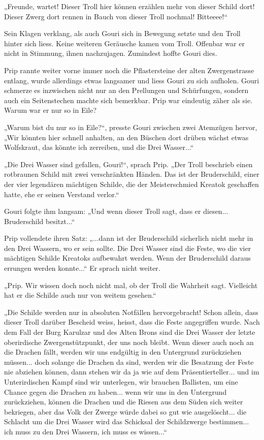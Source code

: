 „Freunde, wartet! Dieser Troll hier können erzählen mehr von dieser Schild dort! Dieser Zwerg dort rennen in Bauch von dieser Troll nochmal! Bitteeee!“

Sein Klagen verklang, als auch Gouri sich in Bewegung setzte und den Troll hinter sich liess. Keine weiteren Geräusche kamen vom Troll. Offenbar war er nicht in Stimmung, ihnen nachzujagen. Zumindest hoffte Gouri dies.

Prip rannte weiter vorne immer noch die Pflastersteine der alten Zwergenstrasse entlang, wurde allerdings etwas langsamer und liess Gouri zu sich aufholen. Gouri schmerze es inzwischen nicht nur an den Prellungen und Schürfungen, sondern auch ein Seitenstechen machte sich bemerkbar. Prip war eindeutig zäher als sie. Warum war er nur so in Eile?

„Warum bist du nur so in Eile?“, presste Gouri zwischen zwei Atemzügen hervor, „Wir könnten hier schnell anhalten, an den Büschen dort drüben wächst etwas Wolfskraut, das könnte ich zerreiben, und die Drei Wasser...“

„Die Drei Wasser sind gefallen, Gouri!“, sprach Prip. „Der Troll beschrieb einen rotbraunen Schild mit zwei verschränkten Händen. Das ist der Bruderschild, einer der vier legendären mächtigen Schilde, die der Meisterschmied Kreatok geschaffen hatte, ehe er seinen Verstand verlor.“

Gouri folgte ihm langsam: „Und wenn dieser Troll sagt, dass er diesen... Bruderschild besitzt...“

Prip vollendete ihren Satz: „...dann ist der Bruderschild sicherlich nicht mehr in den Drei Wassern, wo er sein sollte. Die Drei Wasser sind die Feste, wo die vier mächtigen Schilde Kreatoks aufbewahrt werden. Wenn der Bruderschild daraus errungen werden konnte...“ Er sprach nicht weiter.

„Prip. Wir wissen doch noch nicht mal, ob der Troll die Wahrheit sagt. Vielleicht hat er die Schilde auch nur von weitem gesehen.“

„Die Schilde werden nur in absoluten Notfällen hervorgebracht! Schon allein, dass dieser Troll darüber Bescheid weiss, heisst, dass die Feste angegriffen wurde. Nach dem Fall der Burg Karulzar und des Alten Brons sind die Drei Wasser der letzte oberirdische Zwergenstützpunkt, der uns noch bleibt. Wenn dieser auch noch an die Drachen fällt, werden wir uns endgültig in den Untergrund zurückziehen müssen... doch solange die Drachen da sind, werden wir die Besatzung der Feste nie abziehen können, dann stehen wir da ja wie auf dem Präsentierteller... und im Unterirdischen Kampf sind wir unterlegen, wir brauchen Ballisten, um eine Chance gegen die Drachen zu haben... wenn wir uns in den Untergrund zurückziehen, können die Drachen und die Riesen aus dem Süden sich weiter bekriegen, aber das Volk der Zwerge würde dabei so gut wie ausgelöscht... die Schlacht um die Drei Wasser wird das Schicksal der Schildzwerge bestimmen... ich muss zu den Drei Wassern, ich muss es wissen...“

